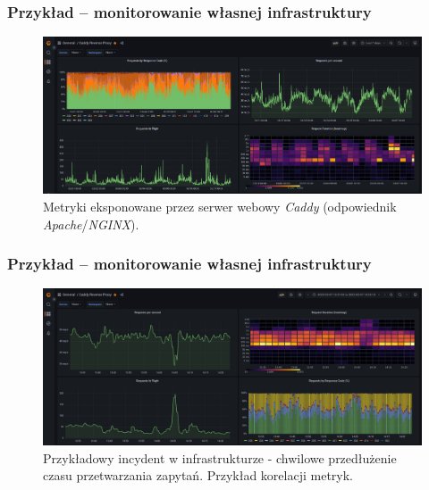 \documentclass[]{beamer}
\begin{document}
\begin{frame}
  \frametitle{Przykład -- monitorowanie własnej infrastruktury}
  \begin{figure}
    \centering
    \includegraphics[width=1.0\linewidth]{grafana_caddy.jpg}
    \caption{Metryki eksponowane przez serwer webowy \textit{Caddy} (odpowiednik \textit{Apache}/\textit{NGINX}).}
  \end{figure}
\end{frame}

\begin{frame}
  \frametitle{Przykład -- monitorowanie własnej infrastruktury}
  \begin{figure}
    \centering
    \includegraphics[width=1.0\linewidth]{grafana_caddy_example_incident.jpg}
    \caption{Przykładowy incydent w infrastrukturze - chwilowe przedłużenie czasu przetwarzania zapytań. Przykład korelacji metryk.}
  \end{figure}
\end{frame}
\end{document}
